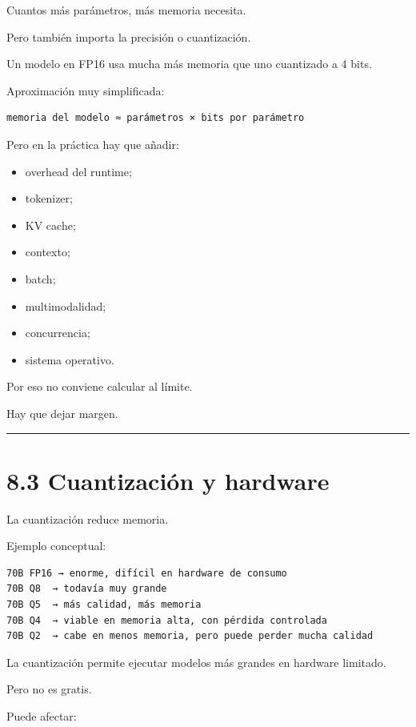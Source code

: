 Cuantos más parámetros, más memoria necesita.

Pero también importa la precisión o cuantización.

Un modelo en FP16 usa mucha más memoria que uno cuantizado a 4 bits.

Aproximación muy simplificada:

\begin{lstlisting}
memoria del modelo ≈ parámetros × bits por parámetro
\end{lstlisting}

Pero en la práctica hay que añadir:

\begin{itemize}
\tightlist
\item
  overhead del runtime;
\item
  tokenizer;
\item
  KV cache;
\item
  contexto;
\item
  batch;
\item
  multimodalidad;
\item
  concurrencia;
\item
  sistema operativo.
\end{itemize}

Por eso no conviene calcular al límite.

Hay que dejar margen.

\begin{center}\rule{0.5\linewidth}{0.5pt}\end{center}

\section{8.3 Cuantización y hardware}\label{cuantizaciuxf3n-y-hardware}

La cuantización reduce memoria.

Ejemplo conceptual:

\begin{lstlisting}
70B FP16 → enorme, difícil en hardware de consumo
70B Q8  → todavía muy grande
70B Q5  → más calidad, más memoria
70B Q4  → viable en memoria alta, con pérdida controlada
70B Q2  → cabe en menos memoria, pero puede perder mucha calidad
\end{lstlisting}

La cuantización permite ejecutar modelos más grandes en hardware
limitado.

Pero no es gratis.

Puede afectar:

